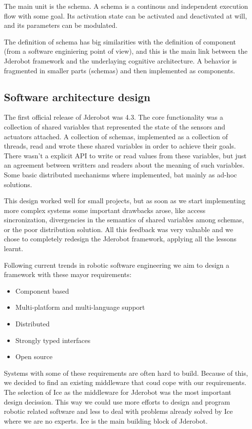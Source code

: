 \documentclass[twocolumn]{svjour3}          %
\begin{document}
The main unit is the schema. A schema is a continous and independent execution flow with some goal. Its activation state can be activated and deactivated at will, and its parameters can be modulated.

The definition of schema has big similarities with the definition of component (from a software enginiering point of view), and this is the main link between the Jderobot framework and the underlaying cognitive architecture. A behavior is fragmented in smaller parts (schemas) and then implemented as components.

\subsection{Software architecture design}
The first official release of Jderobot was 4.3. The core functionality was a collection of shared variables that represented the state of the sensors and actuators attached. A collection of schemas, implemented as a collection of threads, read and wrote these shared variables in order to achieve their goals. There wasn't a explicit API to write or read values from these variables, but just an agreement between writters and readers about the meaning of such variables. Some basic distributed mechanisms where implemented, bat mainly as ad-hoc solutions.

This design worked well for small projects, but as soon as we start implementing more complex systems some important drawbacks arose, like access sincronization, divergencies in the semantics of shared variables among schemas, or the poor distribution solution. All this feedback was very valuable and we chose to completely redesign the Jderobot framework, applying all the lessons learnt.

Following current trends in robotic software engineering we aim to design a framework with these mayor requirements:
\begin{itemize}
\item Component based
\item Multi-platform and multi-language support
\item Distributed
\item Strongly typed interfaces
\item Open source
\end{itemize}

Systems with some of these requirements are often hard to build. Because of this, we decided to find an existing middleware that coud cope with our requirements. The selection of Ice as the middleware for Jderobot was the most important design decission. This way we could use more efforts to design and program robotic related software and less to deal with problems already solved by Ice where we are no experts. Ice is the main building block of Jderobot.
\end{document}
